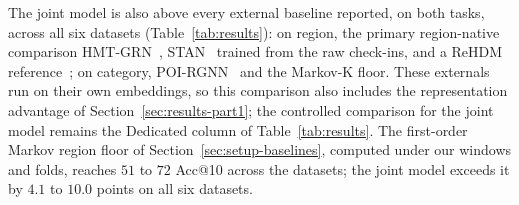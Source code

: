 
The joint model is also above every external baseline reported, on both tasks,
across all six datasets (Table~\ref{tab:results}): on region, the primary
region-native comparison HMT-GRN~\cite{lim2022hmtgrn}, STAN~\cite{luo2021stan}
trained from the raw check-ins, and a ReHDM reference~\cite{li2025rehdm}; on
category, POI-RGNN~\cite{capanema2023poirgnn} and the Markov-K floor. These externals run on their own embeddings, so this comparison
also includes the representation advantage of Section~\ref{sec:results-part1}; the
controlled comparison for the joint model remains the Dedicated column of
Table~\ref{tab:results}. The first-order Markov region floor of Section~\ref{sec:setup-baselines},
computed under our windows and folds, reaches $51$ to $72$ Acc@10 across the
datasets; the joint model exceeds it by $4.1$ to $10.0$ points on all six
datasets.

